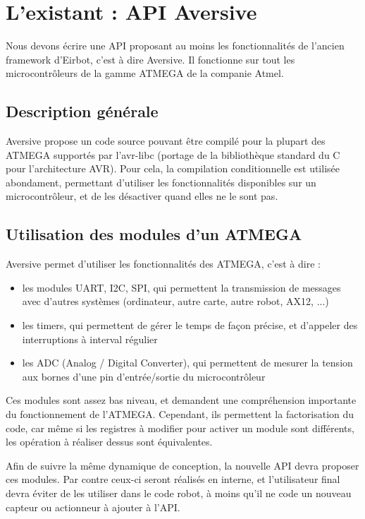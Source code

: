 \section{L'existant : API Aversive}

Nous devons écrire une API proposant au moins les fonctionnalités de l'ancien framework d'Eirbot, c'est à dire Aversive. Il fonctionne sur tout les microcontrôleurs de la gamme ATMEGA de la companie Atmel.

\subsection{Description générale}

Aversive propose un code source pouvant être compilé pour la plupart des ATMEGA supportés par l'avr-libc (portage de la bibliothèque standard du C pour l'architecture AVR). Pour cela, la compilation conditionnelle est utilisée abondament, permettant d'utiliser les fonctionnalités disponibles sur un microcontrôleur, et de les désactiver quand elles ne le sont pas.

\subsection{Utilisation des modules d'un ATMEGA}

Aversive permet d'utiliser les fonctionnalités des ATMEGA, c'est à dire :
\begin{itemize}
    \item{les modules UART, I2C, SPI, qui permettent la transmission de messages avec d'autres systèmes (ordinateur, autre carte, autre robot, AX12, ...)}
    \item{les timers, qui permettent de gérer le temps de façon précise, et d'appeler des interruptions à interval régulier}
    \item{les ADC (Analog / Digital Converter), qui permettent de mesurer la tension aux bornes d'une pin d'entrée/sortie du microcontrôleur}
\end{itemize}

Ces modules sont assez bas niveau, et demandent une compréhension importante du fonctionnement de l'ATMEGA. Cependant, ils permettent la factorisation du code, car même si les registres à modifier pour activer un module sont différents, les opération à réaliser dessus sont équivalentes.

Afin de suivre la même dynamique de conception, la nouvelle API devra proposer ces modules. Par contre ceux-ci seront réalisés en interne, et l'utilisateur final devra éviter de les utiliser dans le code robot, à moins qu'il ne code un nouveau capteur ou actionneur à ajouter à l'API.

